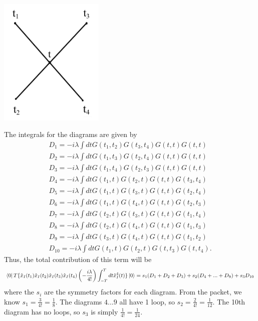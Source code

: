 \begin{center}
    \includegraphics[width=5cm]{sections/IMG_1210.jpeg}
\end{center}
The integrals for the diagrams are given by 
\begin{align}
    D_1=-i\lambda \int dt G(t_1,t_2)G(t_3,t_4)G(t,t)G(t,t) \\
    D_2=-i\lambda \int dt G(t_1,t_3)G(t_2,t_4)G(t,t)G(t,t)\\
    D_3=-i\lambda \int dt G(t_1,t_4)G(t_2,t_3)G(t,t)G(t,t)\\
    D_4=-i\lambda \int dt G(t_1,t)G(t_2,t)G(t,t)G(t_3,t_4)\\
    D_5=-i\lambda \int dt G(t_1,t)G(t_3,t)G(t,t)G(t_2,t_4)\\
    D_6=-i\lambda \int dt G(t_1,t)G(t_4,t)G(t,t)G(t_2,t_3)\\
    D_7=-i\lambda \int dt G(t_2,t)G(t_3,t)G(t,t)G(t_1,t_4)\\
    D_8=-i\lambda \int dt G(t_2,t)G(t_4,t)G(t,t)G(t_1,t_3)\\
    D_9=-i\lambda \int dt G(t_3,t)G(t_4,t)G(t,t)G(t_1,t_2)\\ 
    D_{10}=-i\lambda \int dt G(t_1,t)G(t_2,t)G(t,t_3)G(t,t_4).
\end{align}
Thus, the total contribution of this term will be 
\begin{equation}
    \bra{0} T\{\hat x_I(t_1)\hat x_I(t_2)\hat x_I(t_3)\hat x_I(t_4)\left(-\frac{i\lambda}{4!}\right)\int_{-T}^T dt \hat x_I^4(t)\}\ket{0}=s_1(D_1+D_2+D_3)+s_2(D_4+...+D_9)+s_3D_{10}
\end{equation}
where the $s_i$ are the symmetry factors for each diagram. From the packet, we know $s_1=\frac 3 {4!}=\frac 1 8$. The diagrams $4...9$ all have 1 loop, so $s_2=\frac 2 {4!}=\frac 1 {12}$. The 10th diagram has no loops, so $s_3$ is simply $\frac 1 {4!}=\frac 1 {24}$.


